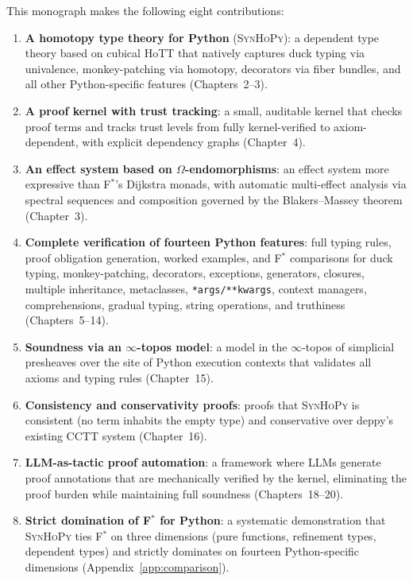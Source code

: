 \documentclass[11pt,a4paper]{report}
\theoremstyle{definition}
\theoremstyle{plain}
\newcommand{\fstar}{F$^{*}$}
\newcommand{\synhopy}{\textsc{SynHoPy}}
\begin{document}
This monograph makes the following eight contributions:

\begin{enumerate}
  \item \textbf{A homotopy type theory for Python} (\synhopy{}): a dependent
    type theory based on cubical HoTT that natively captures duck typing via
    univalence, monkey-patching via homotopy, decorators via fiber bundles,
    and all other Python-specific features (Chapters~2--3).

  \item \textbf{A proof kernel with trust tracking}: a small, auditable
    kernel that checks proof terms and tracks trust levels from fully
    kernel-verified to axiom-dependent, with explicit dependency graphs
    (Chapter~4).

  \item \textbf{An effect system based on $\Omega$-endomorphisms}: an effect
    system more expressive than \fstar{}'s Dijkstra monads, with automatic
    multi-effect analysis via spectral sequences and composition governed
    by the Blakers--Massey theorem (Chapter~3).

  \item \textbf{Complete verification of fourteen Python features}: full
    typing rules, proof obligation generation, worked examples, and
    \fstar{} comparisons for duck typing, monkey-patching, decorators,
    exceptions, generators, closures, multiple inheritance, metaclasses,
    \texttt{*args/**kwargs}, context managers, comprehensions, gradual
    typing, string operations, and truthiness (Chapters~5--14).

  \item \textbf{Soundness via an $\infty$-topos model}: a model in the
    $\infty$-topos of simplicial presheaves over the site of Python execution
    contexts that validates all axioms and typing rules (Chapter~15).

  \item \textbf{Consistency and conservativity proofs}: proofs that
    \synhopy{} is consistent (no term inhabits the empty type) and
    conservative over deppy's existing CCTT system
    (Chapter~16).

  \item \textbf{LLM-as-tactic proof automation}: a framework where
    LLMs generate proof annotations that are mechanically verified by
    the kernel, eliminating the proof burden while maintaining full
    soundness (Chapters~18--20).

  \item \textbf{Strict domination of \fstar{} for Python}: a
    systematic demonstration that \synhopy{} ties \fstar{} on three
    dimensions (pure functions, refinement types, dependent types) and
    strictly dominates on fourteen Python-specific dimensions
    (Appendix~\ref{app:comparison}).
\end{enumerate}
\end{document}
